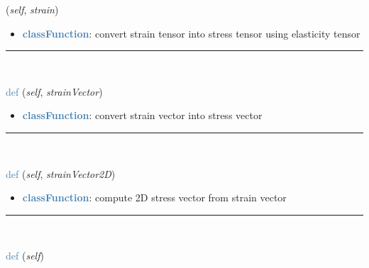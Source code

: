 \begin{itemize}[leftmargin=1.4cm]
\begin{itemize}[leftmargin=1.4cm]
\begin{itemize}[leftmargin=1.4cm]
\begin{itemize}[leftmargin=0.5cm]
\begin{itemize}[leftmargin=1.4cm]
\begin{itemize}[leftmargin=1.4cm]
\begin{itemize}[leftmargin=1.4cm]
\begin{itemize}[leftmargin=0.5cm]
\begin{flushleft}
({\it self}, {\it strain})
\end{flushleft}
\setlength{\itemindent}{0.7cm}
\begin{itemize}[leftmargin=0.7cm]
\item[--]\textcolor{steelblue}{\bf classFunction}: convert strain tensor into stress tensor using elasticity tensor
\vspace{12pt}\end{itemize}
%
\noindent\rule{8cm}{0.75pt}\vspace{1pt} \\ 
\begin{flushleft}
\noindent \textcolor{steelblue}{def {\bf {}}}\label{sec:FEM:KirchhoffMaterial(MaterialBaseClass):StrainVector2StressVector}
({\it self}, {\it strainVector})
\end{flushleft}
\setlength{\itemindent}{0.7cm}
\begin{itemize}[leftmargin=0.7cm]
\item[--]\textcolor{steelblue}{\bf classFunction}: convert strain vector into stress vector
\vspace{12pt}\end{itemize}
%
\noindent\rule{8cm}{0.75pt}\vspace{1pt} \\ 
\begin{flushleft}
\noindent \textcolor{steelblue}{def {\bf {}}}\label{sec:FEM:KirchhoffMaterial(MaterialBaseClass):StrainVector2StressVector2D}
({\it self}, {\it strainVector2D})
\end{flushleft}
\setlength{\itemindent}{0.7cm}
\begin{itemize}[leftmargin=0.7cm]
\item[--]\textcolor{steelblue}{\bf classFunction}: compute 2D stress vector from strain vector
\vspace{12pt}\end{itemize}
%
\noindent\rule{8cm}{0.75pt}\vspace{1pt} \\ 
\begin{flushleft}
\noindent \textcolor{steelblue}{def {\bf {}}}\label{sec:FEM:KirchhoffMaterial(MaterialBaseClass):LameParameters}
({\it self})
\end{flushleft}

\end{itemize}
\end{itemize}
\end{itemize}
\end{itemize}
\end{itemize}
\end{itemize}
\end{itemize}
\end{itemize}
